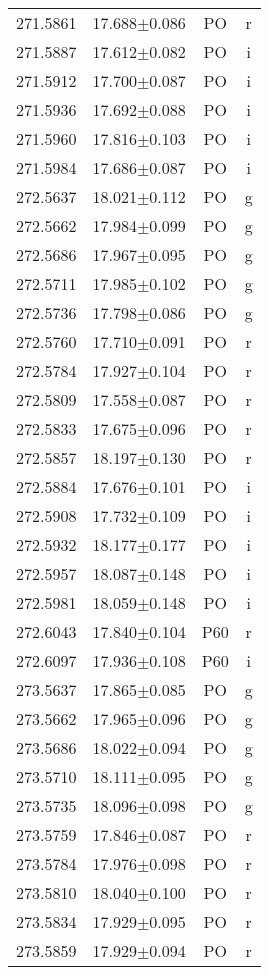\begin{table}
\begin{tabular}{cccc}
271.5861 & 17.688$\pm$0.086 & PO & r \\
271.5887 & 17.612$\pm$0.082 & PO & i \\
271.5912 & 17.700$\pm$0.087 & PO & i \\
271.5936 & 17.692$\pm$0.088 & PO & i \\
271.5960 & 17.816$\pm$0.103 & PO & i \\
271.5984 & 17.686$\pm$0.087 & PO & i \\
272.5637 & 18.021$\pm$0.112 & PO & g \\
272.5662 & 17.984$\pm$0.099 & PO & g \\
272.5686 & 17.967$\pm$0.095 & PO & g \\
272.5711 & 17.985$\pm$0.102 & PO & g \\
272.5736 & 17.798$\pm$0.086 & PO & g \\
272.5760 & 17.710$\pm$0.091 & PO & r \\
272.5784 & 17.927$\pm$0.104 & PO & r \\
272.5809 & 17.558$\pm$0.087 & PO & r \\
272.5833 & 17.675$\pm$0.096 & PO & r \\
272.5857 & 18.197$\pm$0.130 & PO & r \\
272.5884 & 17.676$\pm$0.101 & PO & i \\
272.5908 & 17.732$\pm$0.109 & PO & i \\
272.5932 & 18.177$\pm$0.177 & PO & i \\
272.5957 & 18.087$\pm$0.148 & PO & i \\
272.5981 & 18.059$\pm$0.148 & PO & i \\
272.6043 & 17.840$\pm$0.104 & P60 & r \\
272.6097 & 17.936$\pm$0.108 & P60 & i \\
273.5637 & 17.865$\pm$0.085 & PO & g \\
273.5662 & 17.965$\pm$0.096 & PO & g \\
273.5686 & 18.022$\pm$0.094 & PO & g \\
273.5710 & 18.111$\pm$0.095 & PO & g \\
273.5735 & 18.096$\pm$0.098 & PO & g \\
273.5759 & 17.846$\pm$0.087 & PO & r \\
273.5784 & 17.976$\pm$0.098 & PO & r \\
273.5810 & 18.040$\pm$0.100 & PO & r \\
273.5834 & 17.929$\pm$0.095 & PO & r \\
273.5859 & 17.929$\pm$0.094 & PO & r \\

\end{tabular}
\end{table}
